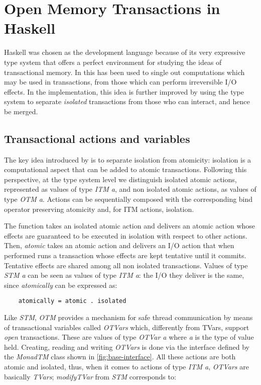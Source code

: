 
\chapter{Open Memory Transactions in Haskell}

Haskell was chosen as the development language because of its very expressive type system that offers a perfect environment for studying the ideas of transactional memory.
In \cite{Harris:2005:CMT:1065944.1065952} this has been used to single out computations which may be used in transactions, from those which can perform irreversible I/O effects. 
In the implementation, this idea is further improved by using the type system to separate \emph{isolated} transactions from those who can interact, and hence be merged.

\section{Transactional actions and variables}
The key idea introduced by \citet{OpenTransactionsSpec} is to separate isolation from atomicity: isolation is a computational aspect that can be added to atomic transactions.
Following this perspective, at the type system level we distinguish isolated atomic actions, represented as values of type \emph{ITM a}, and non isolated atomic actions, as values of type \emph{OTM a}. Actions can be sequentially composed with the corresponding bind operator preserving atomicity and, for ITM actions, isolation.

The function  takes an isolated atomic action and delivers an atomic action whose effects are guaranteed to be executed in isolation with respect to other actions.
Then, \emph{atomic} takes an atomic action and delivers an I/O action that when performed runs a transaction whose effects are kept tentative until it commits.
Tentative effects are shared among all non isolated transactions. Values of type \emph{STM a} can be seen as values of type \emph{ITM a}: the I/O they deliver is the same, since \emph{atomically} can be expressed as:
\begin{Verbatim}
    atomically = atomic . isolated
\end{Verbatim}

Like \emph{STM}, \emph{OTM} provides a mechanism for safe thread
communication by means of transactional variables called \emph{OTVars}
which, differently from TVars, support \emph{open} transactions.
These are values of type \emph{OTVar a} where \emph{a} is the type of value held.
Creating, reading and writing \emph{OTVars} is done via the interface defined by the \emph{MonadTM} class shown in \cref{fig:base-interface}. 
All these actions are both atomic and isolated, thus, when it comes to actions of type \emph{ITM a}, \emph{OTVars} are basically \emph{TVars};
\eg \emph{modifyTVar} from \emph{STM} corresponds to:

